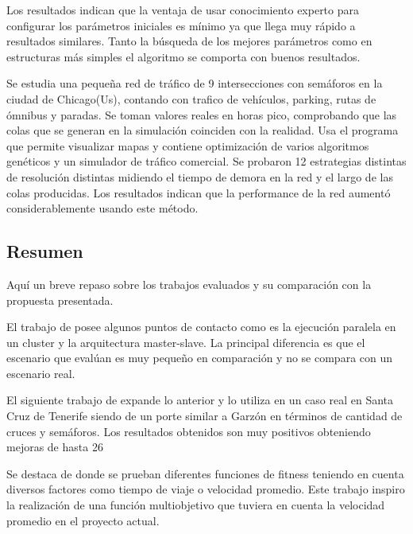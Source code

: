 \begin{itemize}
\begin{item}
		Los resultados indican que la ventaja de usar conocimiento experto para configurar los parámetros iniciales es mínimo ya que llega muy rápido a resultados similares. Tanto la búsqueda de los mejores parámetros como en estructuras más simples el algoritmo se comporta con buenos resultados.
		
	\end{item}	
	
	\begin{item}
		
		Se estudia una pequeña red de tráfico de 9 intersecciones con semáforos en la ciudad de Chicago(Us), contando con trafico de vehículos, parking, rutas de ómnibus y paradas.  
		Se toman valores reales en horas pico, comprobando que las colas que se generan en la simulación coinciden con la realidad.
		Usa el programa \citep{TRANSYT-7F} que permite visualizar mapas y contiene optimización de varios algoritmos genéticos 
		y \citep{CORSIM}  un simulador de tráfico comercial.
		Se probaron 12 estrategias distintas de resolución distintas midiendo el tiempo de demora en la red y el largo de las colas producidas. Los resultados indican que la performance de la red aumentó considerablemente usando este método.	
	\end{item}	
	
\end{itemize}


\subsection{Resumen}
Aquí un breve repaso sobre los trabajos evaluados y su comparación con la propuesta presentada.

El trabajo de \citet{Sanchez2004} posee algunos puntos de contacto como es la ejecución paralela en un cluster y la arquitectura master-slave. La principal diferencia es que el escenario que evalúan es muy pequeño en comparación y no se compara con un escenario real.

El siguiente trabajo de \citet{Sanchez2008} expande lo anterior y lo utiliza en un caso real en Santa Cruz de Tenerife siendo de un porte similar a Garzón en términos de cantidad de cruces y semáforos. Los resultados obtenidos son muy positivos obteniendo mejoras de hasta 26%

Se destaca de \citet{Sanchez2010} donde se prueban diferentes funciones de fitness teniendo en cuenta diversos factores como tiempo de viaje o velocidad promedio. Este trabajo inspiro la realización de una función multiobjetivo que tuviera en cuenta la velocidad promedio en el proyecto actual.

